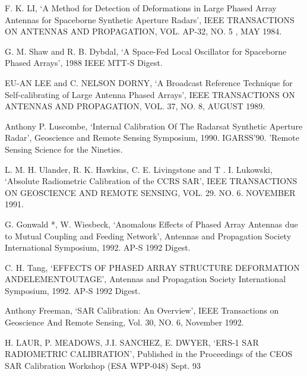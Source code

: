 \documentclass[a4paper,10pt]{article}
\begin{document}
	\begin{enumerate}[ {[}1{]} ]
		\item \label{ppr:aligment1} F. K. LI, \enquote*{A Method for Detection 
		of Deformations in Large Phased Array Antennas for Spaceborne Synthetic
		Aperture Radars}, IEEE TRANSACTIONS ON ANTENNAS AND PROPAGATION, VOL. 
		AP-32, NO. 5 , MAY 1984.
		
		\item \label{ppr:aligment2} G. M. Shaw and R. B. Dybdal, \enquote*{A 
		Space-Fed Local Oscillator for Spaceborne Phased Arrays}, 1988 IEEE 
		MTT-S Digest.

		\item \label{ppr:brdcast1} EU-AN LEE and C. NELSON DORNY, \enquote*{A 
		Broadcast Reference Technique for Self-calibrating of Large Antenna 
		Phased Arrays}, IEEE TRANSACTIONS ON ANTENNAS AND PROPAGATION, VOL. 37,
		NO. 8, AUGUST 1989.
		
		\item \label{ppr:classic1} Anthony P. Luscombe, \enquote*{Internal 
		Calibration Of The Radarsat Synthetic Aperture Radar}, Geoscience and 
		Remote Sensing Symposium, 1990. IGARSS'90. 'Remote Sensing Science for 
		the Nineties.
		
		\item \label{ppr:absRad1} L. M. H. Ulander, R. K. Hawkins, C. E.
		Livingstone and T . I. Lukowski, \enquote*{Absolute Radiometric 
		Calibration of the CCRS SAR}, IEEE TRANSACTIONS ON GEOSCIENCE AND REMOTE
		SENSING, VOL. 29. NO. 6. NOVEMBER 1991.
		
		\item G. Gonwald *, W. Wiesbeck, \enquote*{Anomalous Effects of Phased 
		Array Antennas due to Mutual Coupling and Feeding Network}, Antennas and
		Propagation Society International Symposium, 1992. AP-S 1992 Digest.
		
		\item C. H. Tang, \enquote*{EFFECTS OF PHASED ARRAY STRUCTURE
		DEFORMATION ANDELEMENTOUTAGE}, Antennas and Propagation Society 
		International Symposium, 1992. AP-S 1992 Digest.
		
		\item \label{ppr:puncTrgt1} Anthony Freeman, \enquote*{SAR Calibration: 
		An Overview}, IEEE Transactions on Geoscience And Remote Sensing, Vol. 
		30, NO. 6, November 1992.
		
		\item \label{ppr:rad2} H. LAUR, P. MEADOWS, J.I. SANCHEZ, E. DWYER, 
		\enquote*{ERS-1 SAR RADIOMETRIC CALIBRATION}, Published in the 
		Proceedings of the CEOS SAR Calibration Workshop (ESA WPP-048) Sept. 93
		

\end{enumerate}
\end{document}
